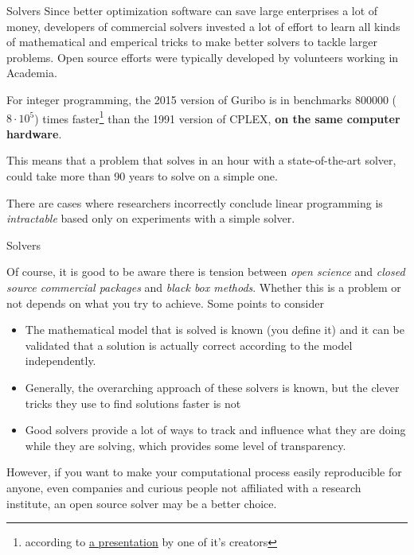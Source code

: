 \documentclass[10pt]{beamer}
\begin{document}
\begin{frame}[fragile]{Solvers}
Since better optimization software can save large enterprises a lot of money, developers of commercial solvers invested a lot
of effort to learn all kinds of mathematical and emperical tricks to make better solvers to tackle larger problems.
Open source efforts were typically developed by volunteers working in Academia.

For integer programming, the 2015 version of Guribo is in benchmarks 800000 ($8\cdot10^5$) times faster\footnote{according to \href{https://www.lnmb.nl/conferences/2015/programlnmbconference/LNMB-NGB_Bixby.pdf}{\color{cyan}\underline{a presentation}} by one of it's creators} than the 1991 version of
CPLEX, \textbf{on the same computer hardware}. 

This means that a problem that solves in an hour with a state-of-the-art solver, could take more than 90 years to solve on a simple one.

There are cases where researchers incorrectly conclude linear programming is \emph{intractable} based only on experiments with a simple solver.
\end{frame}

\begin{frame}[fragile]{Solvers}

Of course, it is good to be aware there is tension between \emph{open science} and \emph{closed source commercial packages} and \emph{black box methods}.
Whether this is a problem or not depends on what you try to achieve. Some points to consider

\begin{itemize}
	\item The mathematical model that is solved is known (you define it) and it can be validated that a solution is actually correct according to the model independently.
	\item Generally, the overarching approach of these solvers is known, but the clever tricks they use to find solutions faster is not
	\item Good solvers provide a lot of ways to track and influence what they are doing while they are solving, which provides some level of transparency.
\end{itemize} 

However, if you want to make your computational process easily reproducible for anyone, even companies and curious people not affiliated with a research institute,
an open source solver may be a better choice.

\end{frame}
\end{document}
